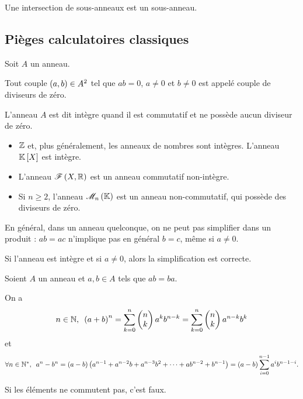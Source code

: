 \begin{prop}
Une intersection de sous-anneaux est un sous-anneau.
\end{prop}

\subsection{Pièges calculatoires classiques}

\begin{defi}
Soit \(A\) un anneau.

Tout couple \(\left(a,b\right)\in A^2\) tel que \(ab=0\), \(a\not=0\) et \(b\not=0\) est appelé couple de diviseurs de zéro.

L'anneau \(A\) est dit intègre quand il est commutatif et ne possède aucun diviseur de zéro.
\end{defi}

\begin{ex}
\begin{itemize}
    \item \(\mathbb{Z}\) et, plus généralement, les anneaux de nombres sont intègres. L'anneau \(\poly\) est intègre. \\
    \item L'anneau \(\mathscr{F}\left(X,\mathbb{R}\right)\) est un anneau commutatif non-intègre. \\
    \item Si \(n\geq2\), l'anneau \(\M{n}\) est un anneau non-commutatif, qui possède des diviseurs de zéro.
\end{itemize}
\end{ex}

\begin{rem}
En général, dans un anneau quelconque, on ne peut pas simplifier dans un produit : \(ab=ac\) n'implique pas en général \(b=c\), même si \(a\not=0\).

Si l'anneau est intègre et si \(a\not=0\), alors la simplification est correcte.
\end{rem}

\begin{prop}
Soient \(A\) un anneau et \(a,b\in A\) tels que \(ab=ba\).

On a \[\quantifs{n\in\N}\paren{a+b}^n=\sum_{k=0}^n\binom{k}{n}a^kb^{n-k}=\sum_{k=0}^n\binom{k}{n}a^{n-k}b^k\] et \[\quantifs{\forall n\in\Ns}a^n-b^n=\paren{a-b}\paren{a^{n-1}+a^{n-2}b+a^{n-3}b^2+\dots+ab^{n-2}+b^{n-1}}=\paren{a-b}\sum_{i=0}^{n-1}a^ib^{n-1-i}.\]
\end{prop}

\begin{rem}
Si les éléments ne commutent pas, c'est faux.
\end{rem}

